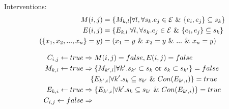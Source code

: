 \documentclass{article}
\begin{document}
    Interventions:
    \begin{align*}
        M(i,j) & = \{M_{k,l}|\forall l ,\forall s_k.  e_j \in \mathcal{E} \ \& \  \{e_i,e_j\} \subseteq s_k\} \\
        E(i,j) & = \{E_{k,l}|\forall l ,\forall s_k.  e_j \in \mathcal{E} \ \& \  \{e_i,e_j\} \subseteq s_k\} \\
        ( \{x_1,x_2,...,x_n\} = y ) 
        & =  (x_1 = y \ \& \  x_2 = y \ \& \  ... \ \& \  x_n = y) \\
    \end{align*}

    \begin{align*}
        C_{i,j} \leftarrow true 
        & \Rightarrow M(i,j) = false, E(i,j) = false  \\
        M_{k,i} \leftarrow true
        & \Rightarrow \{M_{k',i}|\forall k'. s_{k'} \subset s_k \text{ or } s_k \subset s_{k'}\} = false \\
        & \phantom{\Rightarrow} 
        \{E_{k',i}| \forall k'. s_k \subseteq s_{k'} \ \& \  Con(E_{k',i}) \} = true \\
        E_{k,i} \leftarrow true 
        & \Rightarrow \{E_{k',i}| \forall k'. s_k \subseteq s_{k'} \ \& \  Con(E_{k',i}) \} = true \\
        C_{i,j} \leftarrow false
        & \Rightarrow 
    \end{align*}
\end{document}
